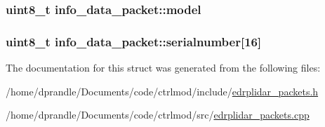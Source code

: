 \hypertarget{structinfo__data__packet_ab12797b480268b15712470dc9dd5cde9}{
\subsubsection[{model}]{\setlength{\rightskip}{0pt plus 5cm}uint8\-\_\-t info\-\_\-data\-\_\-packet\-::model}}\label{structinfo__data__packet_ab12797b480268b15712470dc9dd5cde9}
\hypertarget{structinfo__data__packet_a17f0e185c469b1502816ccccc371165b}{
\subsubsection[{serialnumber}]{\setlength{\rightskip}{0pt plus 5cm}uint8\-\_\-t info\-\_\-data\-\_\-packet\-::serialnumber\mbox{[}16\mbox{]}}}\label{structinfo__data__packet_a17f0e185c469b1502816ccccc371165b}


The documentation for this struct was generated from the following files\-:\begin{DoxyCompactItemize}
\item 
/home/dprandle/\-Documents/code/ctrlmod/include/\hyperlink{edrplidar__packets_8h}{edrplidar\-\_\-packets.\-h}\item 
/home/dprandle/\-Documents/code/ctrlmod/src/\hyperlink{edrplidar__packets_8cpp}{edrplidar\-\_\-packets.\-cpp}\end{DoxyCompactItemize}
